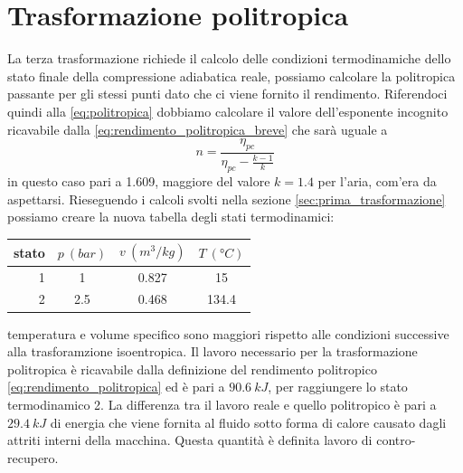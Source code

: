 \documentclass[a4paper,12pt]{article}
\begin{document}
\section{Trasformazione politropica}
\label{sec:terza_trasformazione}
La terza trasformazione richiede il calcolo delle condizioni termodinamiche dello stato finale della
compressione adiabatica reale, possiamo calcolare la politropica passante per gli stessi punti dato che
ci viene fornito il rendimento.
Riferendoci quindi alla \eqref{eq:politropica} dobbiamo calcolare il valore dell'esponente incognito
ricavabile dalla \eqref{eq:rendimento_politropica_breve} che sarà uguale a
\begin{equation}
    \label{eq:esp_politropica}
    n = \frac{\eta_{pc}}{\eta_{pc}-\displaystyle\frac{k-1}{k}}
\end{equation}
in questo caso pari a 1.609, maggiore del valore $k = 1.4$ per l'aria, com'era da aspettarsi.
Rieseguendo i calcoli svolti nella sezione \ref{sec:prima_trasformazione} possiamo creare la nuova tabella
degli stati termodinamici:

\begin{center}
    \begin{tabular}{r|c|c|c}
        stato    & $p\ (bar)$ & $v\ (m^3/kg)$ & $T\ (\text{°}C) $\\ \hline
        1   &           1 &          0.827    &           15     \\ \hline
        2   &         2.5 &          0.468    &           134.4
    \end{tabular}
\end{center}
temperatura e volume specifico sono maggiori rispetto alle condizioni successive alla trasforamzione
isoentropica.
Il lavoro necessario per la trasformazione politropica è ricavabile dalla definizione del rendimento politropico
\eqref{eq:rendimento_politropica} ed è pari a $90.6\ kJ$, per raggiungere lo stato termodinamico 2.
La differenza tra il lavoro reale e quello politropico è pari a $29.4\ kJ$ di energia che viene fornita al fluido
sotto forma di calore causato dagli attriti interni della macchina. Questa quantità è definita lavoro di contro-recupero.
\end{document}
